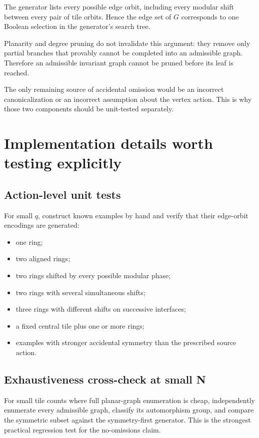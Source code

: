 \documentclass[11pt]{article}
\begin{document}
The generator lists every possible edge orbit, including every modular shift between every pair of tile orbits. Hence the edge set of \(G\) corresponds to one Boolean selection in the generator's search tree.

Planarity and degree pruning do not invalidate this argument: they remove only partial branches that provably cannot be completed into an admissible graph. Therefore an admissible invariant graph cannot be pruned before its leaf is reached.

The only remaining source of accidental omission would be an incorrect canonicalization or an incorrect assumption about the vertex action. This is why those two components should be unit-tested separately.

\section{Implementation details worth testing explicitly}

\subsection{Action-level unit tests}

For small \(q\), construct known examples by hand and verify that their edge-orbit encodings are generated:
\begin{itemize}
  \item one ring;
  \item two aligned rings;
  \item two rings shifted by every possible modular phase;
  \item two rings with several simultaneous shifts;
  \item three rings with different shifts on successive interfaces;
  \item a fixed central tile plus one or more rings;
  \item examples with stronger accidental symmetry than the prescribed source action.
\end{itemize}

\subsection{Exhaustiveness cross-check at small N}

For small tile counts where full planar-graph enumeration is cheap, independently enumerate every admissible graph, classify its automorphism group, and compare the symmetric subset against the symmetry-first generator. This is the strongest practical regression test for the no-omissions claim.
\end{document}

